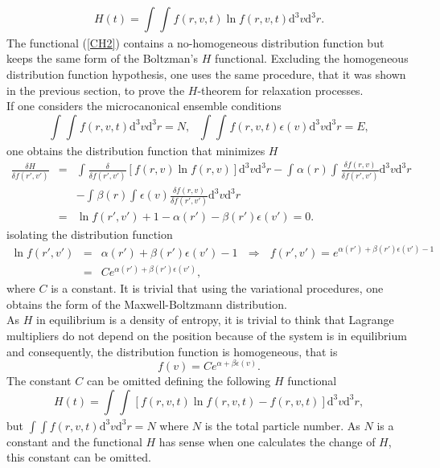 \documentclass{article}
\begin{document}
\begin{equation}
   H(t)=\int_{}^{}\int_{}^{} f(r,v,t) \ln f(r,v,t)\mathrm{d}^3v \mathrm{d}^3r \label{CH2}.
\end{equation}{}
The functional (\ref{CH2}) contains a no-homogeneous distribution function but keeps the same form of the Boltzman's $H$ functional. Excluding the homogeneous distribution function hypothesis, one uses the same procedure, that it was shown in the previous section, to prove the $H$-theorem for relaxation processes.\\ 
If one considers the microcanonical ensemble conditions 
\begin{equation}
    \int_{}^{}\int_{}^{}f(r,v,t)\mathrm{d}^3v \mathrm{d}^3r=N, \ \ \ \int_{}^{}\int_{}^{}f(r,v,t)\epsilon(v)\mathrm{d}^3v \mathrm{d}^3r=E \label{micro},
\end{equation}{}
one obtains the distribution function that minimizes $H$
\begin{eqnarray}
\frac{\delta H}{\delta f(r',v')}&=&\int_{}^{}\frac{\delta}{\delta f(r',v')}\left[f(r,v)\ln f(r,v)  \right]\mathrm{d}^3v \mathrm{d}^3r-\int_{}^{}\alpha(r)\int_{}^{}\frac{\delta f(r,v)}{\delta f(r',v')}\mathrm{d}^3v \mathrm{d}^3r\nonumber \\
&&-\int_{}^{}\beta(r) \int_{}^{}\epsilon(v)\frac{\delta f(r,v)}{\delta f(r',v')}\mathrm{d}^3v \mathrm{d}^3r\nonumber \\
&=&\ln f(r',v')+1-\alpha(r')-\beta(r') \epsilon(v')=0.
\end{eqnarray}{}
isolating the distribution function 
\begin{eqnarray}
\ln f(r',v')&=&\alpha(r')+\beta(r') \epsilon(v')-1 \ \ \  \Rightarrow \ \ \ f(r',v')=e^{\alpha(r') +\beta(r') \epsilon(v')-1} \nonumber \\
&=&Ce^{\alpha(r')+\beta(r') \epsilon(v') } \label{relacion1},
\end{eqnarray}{}
where $C$ is a constant. It is trivial that using the variational procedures, one obtains the form of the Maxwell-Boltzmann distribution. \\
As $H$ in equilibrium is a density of entropy, it is trivial to think that Lagrange multipliers do not depend on the position because of the system is in equilibrium and consequently, the distribution function is homogeneous, that is
\begin{equation}
    f(v)=Ce^{\alpha+\beta \epsilon(v)}.
\end{equation}{} 
The constant $C$ can be omitted defining the following $H$ functional
\begin{equation}
   H(t)=\int_{}^{}\int_{}^{} \left[f(r,v,t) \ln f(r,v,t)-f(r,v,t)\right]\mathrm{d}^3v \mathrm{d}^3r \label{CH3},
\end{equation}{}
  but $\int \int f(r,v,t)\mathrm{d}^3v \mathrm{d}^3r=N$ where $N$ is the total particle number. As $N$ is a constant and the functional $H$ has sense when one calculates the change of $H$, this constant can be omitted. 
\end{document}
